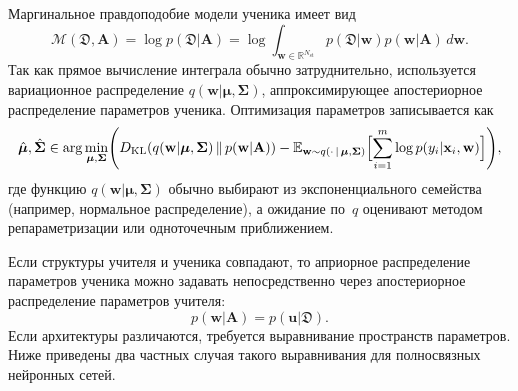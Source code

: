 Маргинальное правдоподобие модели ученика имеет вид
\[
    \mathcal{M}(\mathfrak{D}, \mathbf{A})
    =
    \log p(\mathfrak{D}|\mathbf{A})
    =
    \log \int_{\mathbf{w}\in\mathbb{R}^{N_{\mathrm{st}}}}
    p(\mathfrak{D}|\mathbf{w})p(\mathbf{w}|\mathbf{A})\,d\mathbf{w}.
\]
Так как прямое вычисление интеграла обычно затруднительно, используется вариационное распределение $q(\mathbf{w}|\boldsymbol{\mu},\boldsymbol{\Sigma})$, аппроксимирующее апостериорное распределение параметров ученика. Оптимизация параметров записывается как
    \[
        \hat{\boldsymbol{\mu}},\hat{\boldsymbol{\Sigma}}
    \in
    \arg\min_{\boldsymbol{\mu},\boldsymbol{\Sigma}}
    \Biggl(
        D_{\mathrm{KL}}\!\left(
            q(\mathbf{w}|\boldsymbol{\mu},\boldsymbol{\Sigma})
            \,\|\,p(\mathbf{w}|\mathbf{A})
        \right)
        -
        \mathbb{E}_{\mathbf{w}\sim q(\cdot\,|\,\boldsymbol{\mu},\boldsymbol{\Sigma})}\Bigl[\sum_{i=1}^{m}\log p(y_i|\mathbf{x}_i,\mathbf{w})\Bigr]
    \Biggr),
    \]
    где функцию $q(\mathbf{w}|\boldsymbol{\mu},\boldsymbol{\Sigma})$ обычно выбирают из экспоненциального семейства (например, нормальное распределение), а ожидание по~$q$ оценивают методом репараметризации или одноточечным приближением.

Если структуры учителя и ученика совпадают, то априорное распределение параметров ученика можно задавать непосредственно через апостериорное распределение параметров учителя:
\[
    p(\mathbf{w}|\mathbf{A}) = p(\mathbf{u}|\mathfrak{D}).
\]
Если архитектуры различаются, требуется выравнивание пространств параметров. Ниже приведены два частных случая такого выравнивания для полносвязных нейронных сетей.

